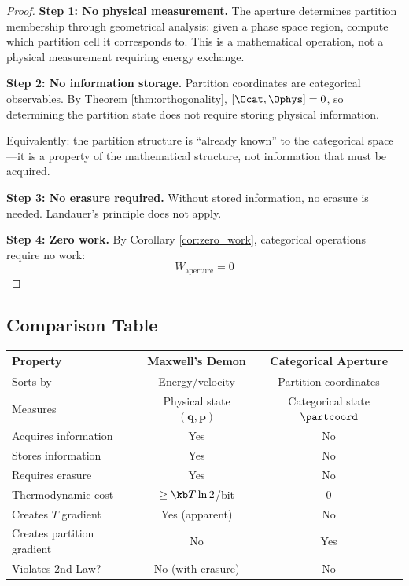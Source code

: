 \begin{proof}
\textbf{Step 1: No physical measurement.}
The aperture determines partition membership through geometrical analysis: given a phase space region, compute which partition cell it corresponds to. This is a mathematical operation, not a physical measurement requiring energy exchange.

\textbf{Step 2: No information storage.}
Partition coordinates are categorical observables. By Theorem \ref{thm:orthogonality}, $[\Ocat, \Ophys] = 0$, so determining the partition state does not require storing physical information.

Equivalently: the partition structure is ``already known'' to the categorical space---it is a property of the mathematical structure, not information that must be acquired.

\textbf{Step 3: No erasure required.}
Without stored information, no erasure is needed. Landauer's principle does not apply.

\textbf{Step 4: Zero work.}
By Corollary \ref{cor:zero_work}, categorical operations require no work:
\begin{equation}
W_{\text{aperture}} = 0
\end{equation}
\end{proof}

\subsection{Comparison Table}

\begin{center}
\begin{tabular}{lcc}
\toprule
\textbf{Property} & \textbf{Maxwell's Demon} & \textbf{Categorical Aperture} \\
\midrule
Sorts by & Energy/velocity & Partition coordinates \\
Measures & Physical state $(\mathbf{q}, \mathbf{p})$ & Categorical state $\partcoord$ \\
Acquires information & Yes & No \\
Stores information & Yes & No \\
Requires erasure & Yes & No \\
Thermodynamic cost & $\geq \kb T \ln 2$/bit & 0 \\
Creates $T$ gradient & Yes (apparent) & No \\
Creates partition gradient & No & Yes \\
Violates 2nd Law? & No (with erasure) & No \\
\bottomrule
\end{tabular}
\end{center}

